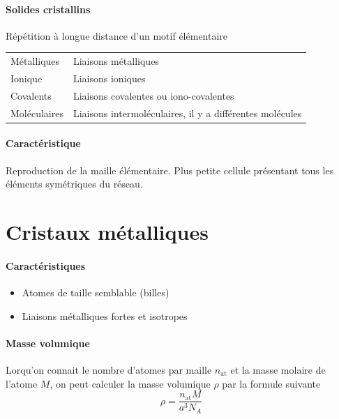 \documentclass[11pt,a4paper,french]{article}
\begin{document}
\paragraph{Solides cristallins}
Répétition à longue distance d'un motif élémentaire
\begin{center}
	\begin{tabular}{ll}
		Métalliques & Liaisons métalliques\\
		Ionique & Liaisons ioniques\\
		Covalents & Liaisons covalentes ou iono-covalentes\\
		Moléculaires & Liaisons intermoléculaires, il y a différentes molécules
	\end{tabular}
\end{center}

\paragraph{Caractéristique}
Reproduction de la maille élémentaire.
Plus petite cellule présentant tous les éléments symétriques du réseau.

\section{Cristaux métalliques}

\paragraph{Caractéristiques}
\begin{itemize}
	\item Atomes de taille semblable (billes)
	\item Liaisons métalliques fortes et isotropes
\end{itemize}

\paragraph{Masse volumique}
Lorqu'on connait le nombre d'atomes par maille $n_{\mathrm{at}}$ et la masse molaire de l'atome $M$,
on peut calculer la masse volumique $\rho$ par la formule suivante
\[ \rho = \frac{n_{\mathrm{at}}M}{a^3N_A} \]
\end{document}
